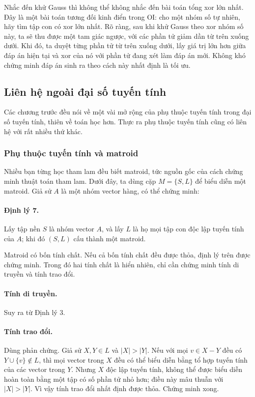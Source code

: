 \documentclass[11pt]{article}
\begin{document}
Nhắc đến khử Gauss thì không thể không nhắc đến bài toán tổng xor lớn nhất. Đây
là một bài toán tương đối kinh điển trong OI: cho một nhóm số tự nhiên, hãy tìm
tập con có xor lớn nhất. Rõ ràng, sau khi khử Gauss theo xor nhóm số này, ta sẽ
thu được một tam giác ngược, với các phần tử giảm dần từ trên xuống dưới. Khi
đó, ta duyệt từng phần tử từ trên xuống dưới, lấy giá trị lớn hơn giữa đáp án
hiện tại và xor của nó với phần tử đang xét làm đáp án mới. Không khó chứng minh
đáp án sinh ra theo cách này nhất định là tối ưu.

\subsection{Liên hệ ngoài đại số tuyến tính}

Các chương trước đều nói về một vài mở rộng của phụ thuộc tuyến tính trong đại
số tuyến tính, thiên về toán học hơn. Thực ra phụ thuộc tuyến tính cũng có liên
hệ với rất nhiều thứ khác.

\subsubsection{Phụ thuộc tuyến tính và matroid}

Nhiều bạn từng học tham lam đều biết matroid, tức nguồn gốc của cách chứng minh
thuật toán tham lam. Dưới đây, ta dùng cặp \(M=\{S,L\}\) để biểu diễn một
matroid. Giả sử \(A\) là một nhóm vector hàng, có thể chứng minh:

\paragraph{Định lý 7.}
Lấy tập nền \(S\) là nhóm vector \(A\), và lấy \(L\) là họ mọi tập con độc lập
tuyến tính của \(A\); khi đó \((S,L)\) cấu thành một matroid.

Matroid có bốn tính chất. Nếu cả bốn tính chất đều được thỏa, định lý trên được
chứng minh. Trong đó hai tính chất là hiển nhiên, chỉ cần chứng minh tính di
truyền và tính trao đổi.

\paragraph{Tính di truyền.}
Suy ra từ Định lý 3.

\paragraph{Tính trao đổi.}
Dùng phản chứng. Giả sử \(X,Y\in L\) và \(|X|>|Y|\). Nếu với mọi
\(v\in X-Y\) đều có \(Y\cup\{v\}\notin L\), thì mọi vector trong \(X\) đều có
thể biểu diễn bằng tổ hợp tuyến tính của các vector trong \(Y\). Nhưng \(X\) độc
lập tuyến tính, không thể được biểu diễn hoàn toàn bằng một tập có số phần tử
nhỏ hơn; điều này mâu thuẫn với \(|X|>|Y|\). Vì vậy tính trao đổi nhất định
được thỏa. Chứng minh xong.
\end{document}
